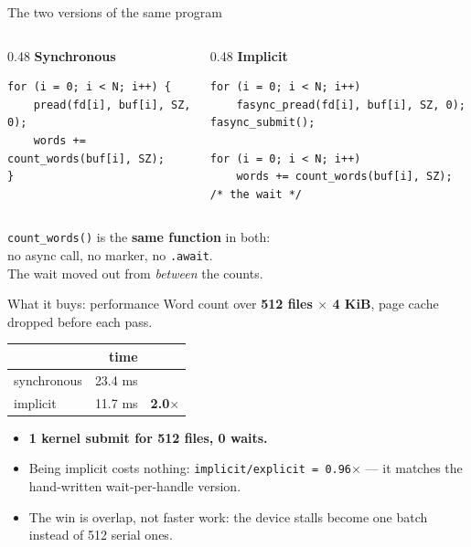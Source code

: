 \documentclass[aspectratio=169]{beamer}
\begin{document}
\begin{frame}{The two versions of the same program}

  \begin{columns}[T]
    \begin{column}{0.48\textwidth}
      \textbf{Synchronous}
      \begin{lstlisting}
for (i = 0; i < N; i++) {
    pread(fd[i], buf[i], SZ, 0);
    words += count_words(buf[i], SZ);
}
      \end{lstlisting}
    \end{column}
    \begin{column}{0.48\textwidth}
      \textbf{Implicit}
      \begin{lstlisting}
for (i = 0; i < N; i++)
    fasync_pread(fd[i], buf[i], SZ, 0);
fasync_submit();

for (i = 0; i < N; i++)
    words += count_words(buf[i], SZ); /* the wait */
      \end{lstlisting}
    \end{column}
  \end{columns}

  \vspace{6pt}
  \begin{center}
    \texttt{count\_words()} is the \textbf{same function} in both:\\
    no async call, no marker, no \texttt{.await}.\\
    The wait moved out from \emph{between} the counts.
  \end{center}
\end{frame}

\begin{frame}{What it buys: performance}
  Word count over \textbf{512 files $\times$ 4 KiB}, page cache dropped before each pass.

  \begin{center}
    \begin{tabular}{lrr}
      \toprule
      & time & \\
      \midrule
      synchronous & 23.4 ms & \\
      implicit    & 11.7 ms & \textbf{2.0$\times$} \\
      \bottomrule
    \end{tabular}
  \end{center}

  \begin{itemize}
    \item \textbf{1 kernel submit for 512 files, 0 waits.}
    \item Being implicit costs nothing: \texttt{implicit/explicit = 0.96$\times$} --- it matches the hand-written wait-per-handle version.
    \item The win is overlap, not faster work: the device stalls become one batch instead of 512 serial ones.
  \end{itemize}
\end{frame}
\end{document}

